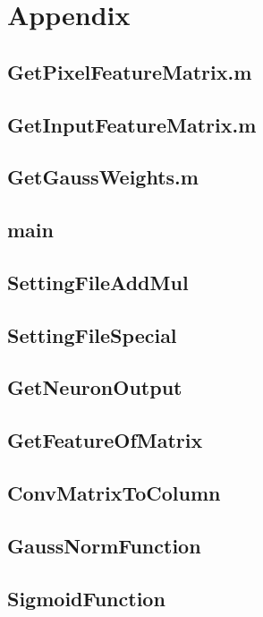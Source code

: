 \newpage
\section{Appendix}\label{Appendix}
\subsection{GetPixelFeatureMatrix.m}\label{GetPixelFeatureMatrix}

\subsection{GetInputFeatureMatrix.m}\label{GetInputFeatureMatrix}

\newpage
\subsection{GetGaussWeights.m}\label{GetGaussWeights}

\newpage
\subsection{main}\label{main}

\newpage
\subsection{SettingFileAddMul}\label{SettingFileAddMul}

\newpage
\subsection{SettingFileSpecial}\label{SettingFileSpecial}

\newpage
\subsection{GetNeuronOutput}\label{GetNeuronOutput}

\newpage
\subsection{GetFeatureOfMatrix}\label{GetFeatureOfMatrix}

\subsection{ConvMatrixToColumn}\label{ConvMatrixToColumn}

\newpage
\subsection{GaussNormFunction}\label{GaussNormFunction}

\newpage
\subsection{SigmoidFunction}\label{SigmoidFunction}

